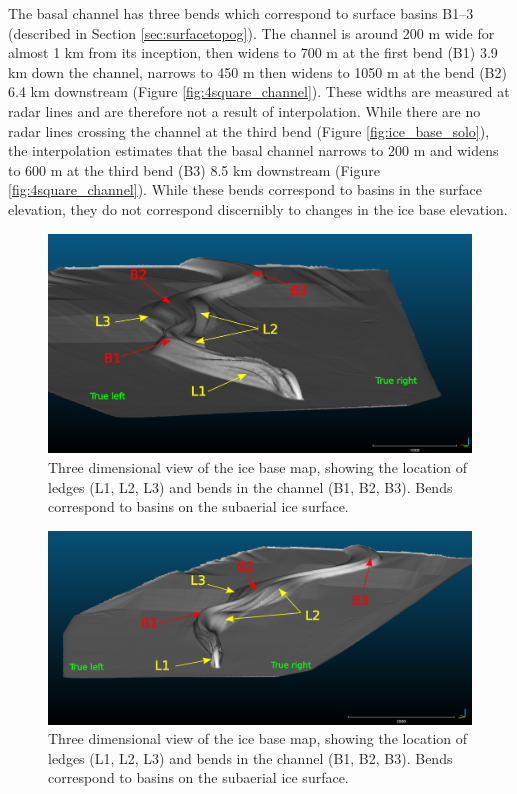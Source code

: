 The basal channel has three bends which correspond to surface basins B1--3 (described in Section \ref{sec:surfacetopog}). The channel is around 200 m wide for almost 1 km from its inception, then widens to 700 m at the first bend (B1) 3.9 km down the channel, narrows to 450 m then widens to 1050 m at the bend (B2) 6.4 km downstream (Figure \ref{fig:4square_channel}). These widths are measured at radar lines and are therefore not a result of interpolation. While there are no radar lines crossing the channel at the third bend (Figure \ref{fig:ice_base_solo}), the interpolation estimates that the basal channel narrows to 200 m and widens to 600 m at the third bend (B3) 8.5 km downstream (Figure \ref{fig:4square_channel}). While these bends correspond to basins in the surface elevation, they do not correspond discernibly to changes in the ice base elevation. 
\begin{figure}[!ht]
\centering
\includegraphics[width=1.1\textwidth]{chapters/2/ledges1.png}
\caption[3D ledge view (A)]{Three dimensional view of the ice base map, showing the location of ledges (L1, L2, L3) and bends in the channel (B1, B2, B3). Bends correspond to basins on the subaerial ice surface.}
\label{fig:ledges1}
\end{figure}

\begin{figure}[!ht]
\centering
\includegraphics[width=1.1\textwidth]{chapters/2/ledges2.png}
\caption[3D ledge view (B)]{Three dimensional view of the ice base map, showing the location of ledges (L1, L2, L3) and bends in the channel (B1, B2, B3). Bends correspond to basins on the subaerial ice surface.}
\label{fig:ledges2}
\end{figure}

